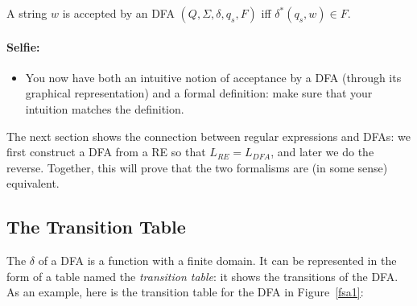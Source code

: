 \begin{definition} \label{defacceptdfa}
A string $w$ is accepted by an DFA
$(Q,\Sigma,\delta,q_s,F)$ iff $\delta^*(q_s,w) \in F$.
\end{definition}

\paragraph{Selfie:}
\begin{itemize}
\item[]
You now have both an intuitive notion of acceptance by a DFA (through
its graphical representation) and a formal definition: make sure that
your intuition matches the definition.
\end{itemize}



The next section shows the connection between regular expressions and
DFAs: we first construct a DFA from a RE so that $L_{RE} = L_{DFA}$,
and later we do the reverse. Together, this will prove that the two
formalisms are (in some sense) equivalent.


\subsection*{The Transition Table}

The $\delta$ of a DFA is a function with a finite domain. It can be
represented in the form of a table named the {\em transition table}:
it shows the transitions of the DFA. As an example,
here is the transition table for the DFA in Figure~\ref{fsa1}:

